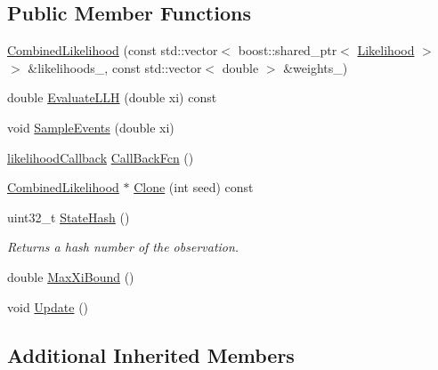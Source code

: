 \subsection*{Public Member Functions}
\begin{DoxyCompactItemize}
\item 
\hyperlink{classCombinedLikelihood_a5f4928ccb337b399d64088e3df58d7be}{Combined\-Likelihood} (const std\-::vector$<$ boost\-::shared\-\_\-ptr$<$ \hyperlink{classLikelihood}{Likelihood} $>$ $>$ \&likelihoods\-\_\-, const std\-::vector$<$ double $>$ \&weights\-\_\-)
\item 
double \hyperlink{classCombinedLikelihood_a5d41f29fd87fcab976a06e0af12e6767}{Evaluate\-L\-L\-H} (double xi) const 
\item 
void \hyperlink{classCombinedLikelihood_a2e3dc150595fdab805b77fc8f2557fa0}{Sample\-Events} (double xi)
\item 
\hyperlink{Likelihood_8h_a97d92c5c141f28319e7e8198defc9084}{likelihood\-Callback} \hyperlink{classCombinedLikelihood_a4d70d16e3f63005427dc9261addd0bfb}{Call\-Back\-Fcn} ()
\item 
\hyperlink{classCombinedLikelihood}{Combined\-Likelihood} $\ast$ \hyperlink{classCombinedLikelihood_afb2505b9b126ddfcc859b150e8345aed}{Clone} (int seed) const 
\item 
uint32\-\_\-t \hyperlink{classCombinedLikelihood_a7980d2517a55eea72e7e272917b1948d}{State\-Hash} ()
\begin{DoxyCompactList}\small\item\em Returns a hash number of the observation. \end{DoxyCompactList}\item 
double \hyperlink{classCombinedLikelihood_a2cf396d545d7873be85a9bbcb72f4b53}{Max\-Xi\-Bound} ()
\item 
void \hyperlink{classCombinedLikelihood_ae6823517190d050b153d421c46a6cd0f}{Update} ()
\end{DoxyCompactItemize}
\subsection*{Additional Inherited Members}


